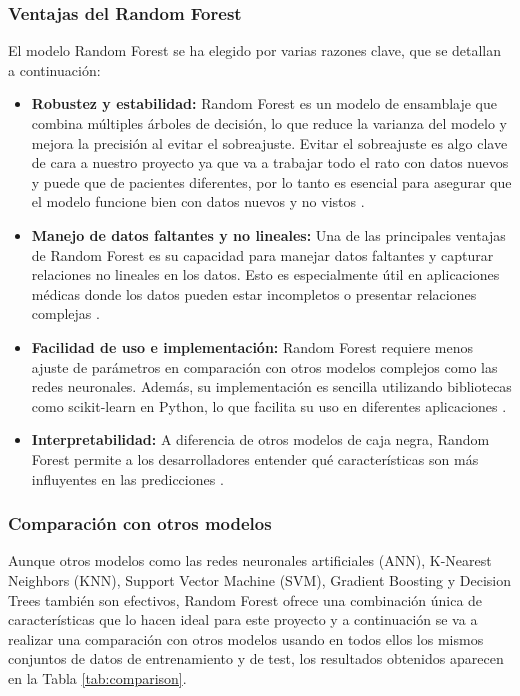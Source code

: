 \subsubsection{Ventajas del Random Forest}

El modelo Random Forest se ha elegido por varias razones clave, que se detallan a continuación:

\begin{itemize}
\item \textbf{Robustez y estabilidad:} Random Forest es un modelo de ensamblaje que combina múltiples árboles de decisión, lo que reduce la varianza del modelo y mejora la precisión al evitar el sobreajuste. Evitar el sobreajuste es algo clave de cara a nuestro proyecto ya que va a trabajar todo el rato con datos nuevos y puede que de pacientes diferentes, por lo tanto es esencial para asegurar que el modelo funcione bien con datos nuevos y no vistos \cite{breiman2001random}.
\item \textbf{Manejo de datos faltantes y no lineales:} Una de las principales ventajas de Random Forest es su capacidad para manejar datos faltantes y capturar relaciones no lineales en los datos. Esto es especialmente útil en aplicaciones médicas donde los datos pueden estar incompletos o presentar relaciones complejas \cite{ho1995random}.
\item \textbf{Facilidad de uso e implementación:} Random Forest requiere menos ajuste de parámetros en comparación con otros modelos complejos como las redes neuronales. Además, su implementación es sencilla utilizando bibliotecas como scikit-learn en Python, lo que facilita su uso en diferentes aplicaciones \cite{scikit-learn}.
\item \textbf{Interpretabilidad:} A diferencia de otros modelos de caja negra, Random Forest permite a los desarrolladores entender qué características son más influyentes en las predicciones \cite{liaw2002classification}.
\end{itemize}

\subsubsection{Comparación con otros modelos}

Aunque otros modelos como las redes neuronales artificiales (ANN), K-Nearest Neighbors (KNN), Support Vector Machine (SVM), Gradient Boosting y Decision Trees también son efectivos, Random Forest ofrece una combinación única de características que lo hacen ideal para este proyecto y a continuación se va a realizar una comparación con otros modelos usando en todos ellos los mismos conjuntos de datos de entrenamiento y de test, los resultados obtenidos aparecen en la Tabla \ref{tab:comparison}.

